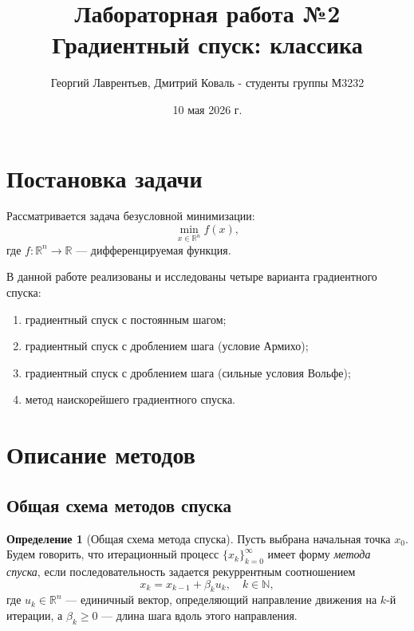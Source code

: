 \documentclass[a4paper,12pt]{article}
\title{Лабораторная работа №2\\Градиентный спуск: классика}
\author{Георгий Лаврентьев, Дмитрий Коваль - студенты группы М3232}
\date{10 мая 2026 г.}
\newcommand{\R}{\mathbb{R}}
\theoremstyle{definition}
\newtheorem{definition}{Определение}[section]
\begin{document}
\maketitle
\vspace{-20pt}

\section{Постановка задачи}

Рассматривается задача безусловной минимизации:
\[
    \min_{x \in \R^n} f(x),
\]
где $f \colon \R^n \to \R$ — дифференцируемая функция.

В данной работе реализованы и исследованы четыре варианта градиентного спуска:
\begin{enumerate}
    \item градиентный спуск с постоянным шагом;
    \item градиентный спуск с дроблением шага (условие Армихо);
    \item градиентный спуск с дроблением шага (сильные условия Вольфе);
    \item метод наискорейшего градиентного спуска.
\end{enumerate}

\section{Описание методов}

\subsection{Общая схема методов спуска}

\begin{definition}[Общая схема метода спуска]
    Пусть выбрана начальная точка $x_0$. Будем говорить, что итерационный процесс 
    $\{x_k\}_{k=0}^{\infty}$ имеет форму \emph{метода спуска}, если последовательность 
    задается рекуррентным соотношением
    \[
        x_k = x_{k-1} + \beta_k u_k, \quad k \in \mathbb{N},
    \]
    где $u_k \in \mathbb{R}^n$ — единичный вектор, определяющий направление движения 
    на $k$-й итерации, а $\beta_k \geq 0$ — длина шага вдоль этого направления.
\end{definition}
\end{document}
